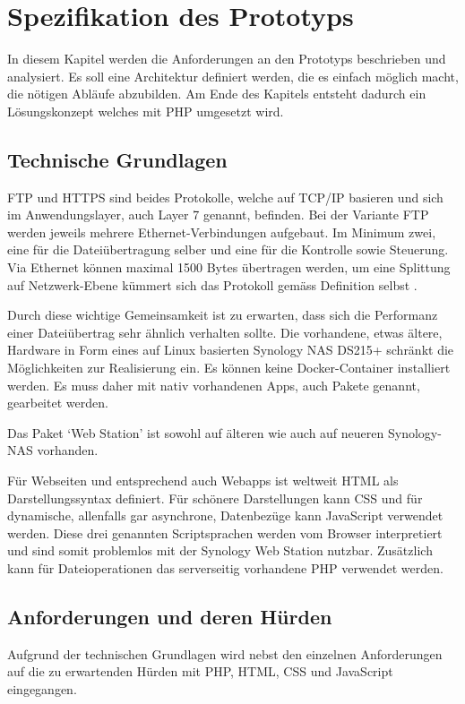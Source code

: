 \chapter{Spezifikation des Prototyps}
In diesem Kapitel werden die Anforderungen an den Prototyps beschrieben und analysiert. 
Es soll eine Architektur definiert werden, die es einfach möglich macht, die nötigen Abläufe abzubilden. 
Am Ende des Kapitels entsteht dadurch ein Lösungskonzept welches mit PHP umgesetzt wird.

\section{Technische Grundlagen}
FTP und HTTPS sind beides Protokolle, welche auf TCP/IP basieren und sich im Anwendungslayer, auch Layer 7 genannt, befinden. \cite[p.~26]{Zisler}  
Bei der Variante FTP werden jeweils mehrere Ethernet-Verbindungen aufgebaut. Im Minimum zwei, eine für die Dateiübertragung selber und eine für die Kontrolle sowie Steuerung.
Via Ethernet können maximal 1500 Bytes übertragen werden, um eine Splittung auf Netzwerk-Ebene kümmert sich das Protokoll gemäss Definition selbst \cite{Zisler}.

Durch diese wichtige Gemeinsamkeit ist zu erwarten, dass sich die Performanz einer Dateiübertrag sehr ähnlich verhalten sollte.
Die vorhandene, etwas ältere, Hardware in Form eines auf Linux basierten Synology NAS DS215+ schränkt die Möglichkeiten zur Realisierung ein. 
Es können keine Docker-Container installiert werden. Es muss daher mit nativ vorhandenen Apps, auch Pakete genannt, gearbeitet werden.  

Das Paket `Web Station' ist sowohl auf älteren wie auch auf neueren Synology-NAS vorhanden. \cite{SynologyWS} 

Für Webseiten und entsprechend auch Webapps ist weltweit HTML als Darstellungssyntax definiert. 
Für schönere Darstellungen kann CSS und für dynamische, allenfalls gar asynchrone, Datenbezüge kann JavaScript verwendet werden. \cite[p.~174]{Butz} 
Diese drei genannten Scriptsprachen werden vom Browser interpretiert und sind somit problemlos mit der Synology Web Station nutzbar.
Zusätzlich kann für Dateioperationen das serverseitig vorhandene PHP \cite{SynologyWS} verwendet werden.

\section{Anforderungen und deren Hürden}
Aufgrund der technischen Grundlagen wird nebst den einzelnen Anforderungen auf die zu erwartenden Hürden mit PHP, HTML, CSS und JavaScript eingegangen.

